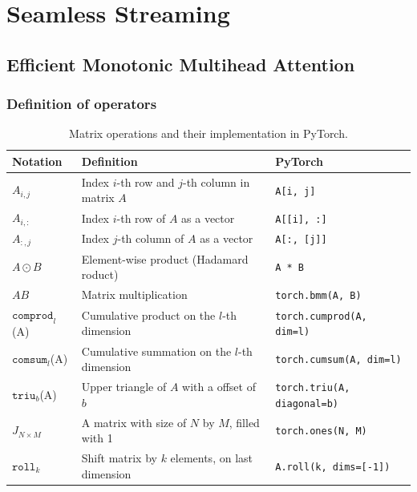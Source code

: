 \FloatBarrier
\section{Seamless Streaming}\label{app:streaming}




















\subsection{Efficient Monotonic Multihead Attention}
\subsubsection{Definition of operators}
\label{app:streaming_operators}
\begin{table}[h]
    \centering
    \small
    \begin{tabular}{l|l|l}
    \toprule 
    Notation & Definition & PyTorch \\
    \midrule
    $A_{i,j}$ & Index $i$-th row and $j$-th column in matrix $A$ & \texttt{A[i, j]}\\
    $A_{i,:}$ & Index $i$-th row of $A$ as a vector& \texttt{A[[i], :]}  \\
    $A_{:,j}$ & Index $j$-th column of $A$ as a vector & \texttt{A[:, [j]]}\\
    $A \odot B$ & Element-wise product (Hadamard roduct) & \texttt{A * B} \\
    $A B$ & Matrix multiplication & \texttt{torch.bmm(A, B)} \\
    $\texttt{comprod}_l$(A) & Cumulative product on the $l$-th dimension & \texttt{torch.cumprod(A, dim=l)} \\
    $\texttt{comsum}_l$(A) & Cumulative summation on the $l$-th dimension & \texttt{torch.cumsum(A, dim=l)} \\
    $\texttt{triu}_b$(A) & Upper triangle of $A$ with a offset of $b$& \texttt{torch.triu(A, diagonal=b)} \\
    $J_{N\times M}$ & A matrix with size of $N$ by $M$, filled with 1 & \texttt{torch.ones(N, M)} \\
    $\texttt{roll}_k$ & Shift matrix by $k$ elements, on last dimension & \texttt{A.roll(k, dims=[-1])} \\
    \bottomrule
    \end{tabular}
    \caption{Matrix operations and their implementation in PyTorch.
    }
    \label{tab:emma_notations}
\end{table}

